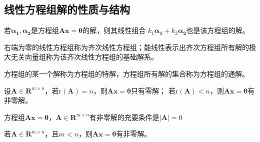 \subsection{线性方程组解的性质与结构}
\begin{theorem}
    若$\boldsymbol{\alpha_1},\boldsymbol{\alpha_2}$是方程组$\boldsymbol{A}\boldsymbol{x}=\boldsymbol{\theta}$的解，则其线性组合
    $k_1\boldsymbol{\alpha_1}+k_2\boldsymbol{\alpha_2}$也是该方程组的解。
\end{theorem}

\begin{definition}
    右端为零的线性方程组称为{\heiti 齐次线性方程组}；能线性表示出齐次方程组所有解的极大无关向量组称为该齐次线性方程组的{\heiti 基础解系}。
\end{definition}

\begin{definition}[方程组的特解、通解]
    方程组的某一个解称为方程组的{\heiti 特解}，方程组所有解的集合称为方程组的{\heiti 通解}。    
\end{definition}

\begin{theorem}
    设$\boldsymbol{A}\in \mathbf{R}^{m\times n}$，若$\mathrm{r}(\boldsymbol{A})=n$，则$\boldsymbol{A}\boldsymbol{x}=\boldsymbol{\theta}$只有零解；
    若$\mathrm{r}(\boldsymbol{A})<n$，则$\boldsymbol{A}\boldsymbol{x}=\boldsymbol{\theta}$有非零解。
\end{theorem}
\begin{remark}
    方程组$\boldsymbol{A}\boldsymbol{x}=\boldsymbol{\theta}$，$\boldsymbol{A}\in \mathbf{R}^{m\times n}$有非零解的充要条件是$|\boldsymbol{A}|=0$
\end{remark}
\begin{remark}
    若$\boldsymbol{A}\in \mathbf{R}^{m\times n}$，且$m<n$，则$\boldsymbol{A}\boldsymbol{x}=\boldsymbol{\theta}$有非零解。
\end{remark}


